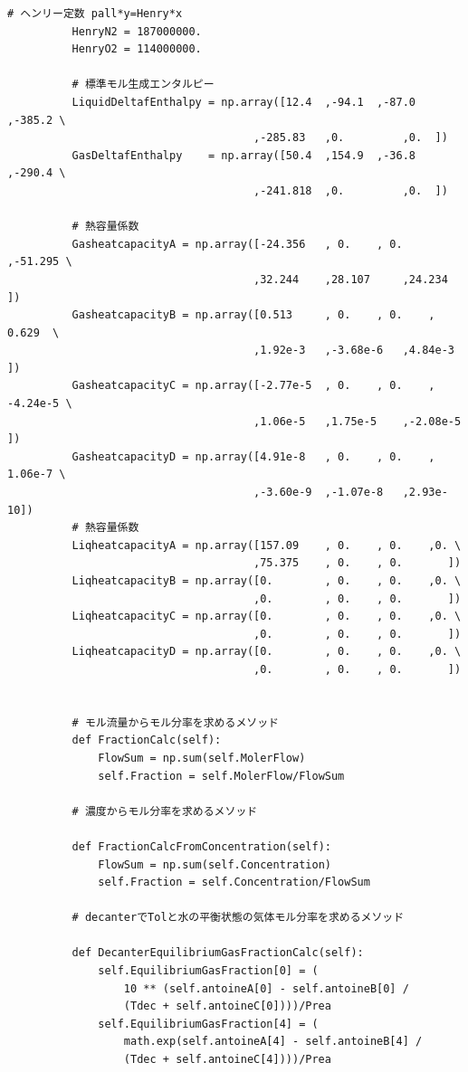 \documentclass[a4j]{jsreport}
\begin{document}
\begin{lstlisting}[caption=気液反応器の解析(迅速に平衡)]
          # ヘンリー定数 pall*y=Henry*x
          HenryN2 = 187000000.
          HenryO2 = 114000000.

          # 標準モル生成エンタルピー
          LiquidDeltafEnthalpy = np.array([12.4  ,-94.1  ,-87.0  ,-385.2 \
                                      ,-285.83   ,0.         ,0.  ])
          GasDeltafEnthalpy    = np.array([50.4  ,154.9  ,-36.8  ,-290.4 \
                                      ,-241.818  ,0.         ,0.  ])

          # 熱容量係数
          GasheatcapacityA = np.array([-24.356   , 0.    , 0.    ,-51.295 \
                                      ,32.244    ,28.107     ,24.234   ])
          GasheatcapacityB = np.array([0.513     , 0.    , 0.    , 0.629  \
                                      ,1.92e-3   ,-3.68e-6   ,4.84e-3  ])
          GasheatcapacityC = np.array([-2.77e-5  , 0.    , 0.    , -4.24e-5 \
                                      ,1.06e-5   ,1.75e-5    ,-2.08e-5 ])
          GasheatcapacityD = np.array([4.91e-8   , 0.    , 0.    , 1.06e-7 \
                                      ,-3.60e-9  ,-1.07e-8   ,2.93e-10])
          # 熱容量係数
          LiqheatcapacityA = np.array([157.09    , 0.    , 0.    ,0. \
                                      ,75.375    , 0.    , 0.       ])
          LiqheatcapacityB = np.array([0.        , 0.    , 0.    ,0. \
                                      ,0.        , 0.    , 0.       ])
          LiqheatcapacityC = np.array([0.        , 0.    , 0.    ,0. \
                                      ,0.        , 0.    , 0.       ])
          LiqheatcapacityD = np.array([0.        , 0.    , 0.    ,0. \
                                      ,0.        , 0.    , 0.       ])


          # モル流量からモル分率を求めるメソッド
          def FractionCalc(self):
              FlowSum = np.sum(self.MolerFlow)
              self.Fraction = self.MolerFlow/FlowSum

          # 濃度からモル分率を求めるメソッド

          def FractionCalcFromConcentration(self):
              FlowSum = np.sum(self.Concentration)
              self.Fraction = self.Concentration/FlowSum

          # decanterでTolと水の平衡状態の気体モル分率を求めるメソッド

          def DecanterEquilibriumGasFractionCalc(self):
              self.EquilibriumGasFraction[0] = (
                  10 ** (self.antoineA[0] - self.antoineB[0] /
                  (Tdec + self.antoineC[0])))/Prea
              self.EquilibriumGasFraction[4] = (
                  math.exp(self.antoineA[4] - self.antoineB[4] /
                  (Tdec + self.antoineC[4])))/Prea


\end{lstlisting}
\end{document}
